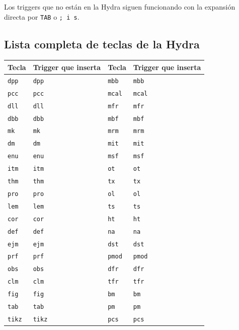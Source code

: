 \documentclass[11pt]{article}
\begin{document}
Los triggers que no están en la Hydra siguen funcionando con la expansión directa por \texttt{TAB} o \texttt{; i s}.
\subsection{Lista completa de teclas de la Hydra}
\label{sec:orgb672f6d}

\begin{center}
\begin{tabular}{llll}
Tecla & Trigger que inserta & Tecla & Trigger que inserta\\
\hline
\texttt{dpp} & \texttt{dpp} & \texttt{mbb} & \texttt{mbb}\\
\texttt{pcc} & \texttt{pcc} & \texttt{mcal} & \texttt{mcal}\\
\texttt{dll} & \texttt{dll} & \texttt{mfr} & \texttt{mfr}\\
\texttt{dbb} & \texttt{dbb} & \texttt{mbf} & \texttt{mbf}\\
\texttt{mk} & \texttt{mk} & \texttt{mrm} & \texttt{mrm}\\
\texttt{dm} & \texttt{dm} & \texttt{mit} & \texttt{mit}\\
\texttt{enu} & \texttt{enu} & \texttt{msf} & \texttt{msf}\\
\texttt{itm} & \texttt{itm} & \texttt{ot} & \texttt{ot}\\
\texttt{thm} & \texttt{thm} & \texttt{tx} & \texttt{tx}\\
\texttt{pro} & \texttt{pro} & \texttt{ol} & \texttt{ol}\\
\texttt{lem} & \texttt{lem} & \texttt{ts} & \texttt{ts}\\
\texttt{cor} & \texttt{cor} & \texttt{ht} & \texttt{ht}\\
\texttt{def} & \texttt{def} & \texttt{na} & \texttt{na}\\
\texttt{ejm} & \texttt{ejm} & \texttt{dst} & \texttt{dst}\\
\texttt{prf} & \texttt{prf} & \texttt{pmod} & \texttt{pmod}\\
\texttt{obs} & \texttt{obs} & \texttt{dfr} & \texttt{dfr}\\
\texttt{clm} & \texttt{clm} & \texttt{tfr} & \texttt{tfr}\\
\texttt{fig} & \texttt{fig} & \texttt{bm} & \texttt{bm}\\
\texttt{tab} & \texttt{tab} & \texttt{pm} & \texttt{pm}\\
\texttt{tikz} & \texttt{tikz} & \texttt{pcs} & \texttt{pcs}\\

\end{tabular}
\end{center}
\end{document}
